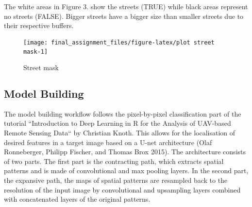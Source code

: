 \documentclass[
]{article}
\begin{document}
The white areas in Figure 3. show the streets (TRUE) while black areas
represent no streets (FALSE). Bigger streets have a bigger size than
smaller streets due to their respective buffers.

\begin{figure}

{\centering \texttt{[image: final\_assignment\_files/figure-latex/plot street mask-1]} 

}

\caption{Street mask}\label{fig:plot street mask}
\end{figure}

\hypertarget{model-building}{%
\subsection{Model Building}\label{model-building}}

The model building workflow follows the pixel-by-pixel classification
part of the tutorial ``Introduction to Deep Learning in R for the
Analysis of UAV-based Remote Sensing Data`` by Christian Knoth. This
allows for the localisation of desired features in a target image based
on a U-net architecture (Olaf Ronneberger, Philipp Fischer, and Thomas
Brox 2015). The architecture consists of two parts. The first part is
the contracting path, which extracts spatial patterns and is made of
convolutional and max pooling layers. In the second part, the expansive
path, the maps of spatial patterns are resampled back to the resolution
of the input image by convolutional and upsampling layers combined with
concatenated layers of the original patterns.
\end{document}
